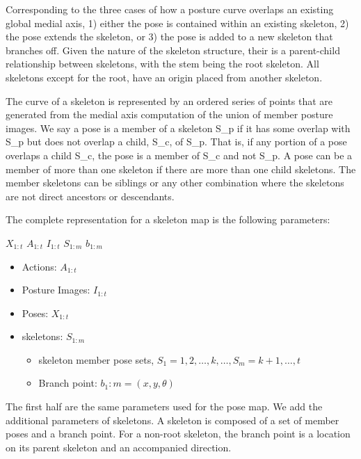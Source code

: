 Corresponding to the three cases of how a posture curve overlaps an existing global medial axis, 1) either the pose is contained within an existing skeleton, 2) the pose extends the skeleton, or 3) the pose is added to a new skeleton that branches off. Given the nature of the skeleton structure, their is a parent-child relationship between skeletons, with the stem being the root skeleton. All skeletons except for the root, have an origin placed from another skeleton.

The curve of a skeleton is represented by an ordered series of points that are generated from the medial axis computation of the union of member posture images. We say a pose is a member of a skeleton S\_p if it has some overlap with S\_p but does not overlap a child, S\_c, of S\_p. That is, if any portion of a pose overlaps a child S\_c, the pose is a member of S\_c and not S\_p. A pose can be a member of more than one skeleton if there are more than one child skeletons. The member skeletons can be siblings or any other combination where the skeletons are not direct ancestors or descendants.

The complete representation for a skeleton map is the following parameters:

$ X_{1:t} $
$ A_{1:t} $
$ I_{1:t} $
$ S_{1:m} $
$ b_{1:m} $

\begin{itemize}
\item Actions: $A_{1:t}$

\item Posture Images: $I_{1:t}$

\item Poses: $X_{1:t}$

\item skeletons: $S_{1:m}$

\begin{itemize}
\item skeleton member pose sets, $S_1 = {1,2,…,k}, …, S_m = {k+1,…,t} $

\item Branch point: $b_1:m = (x,y,\theta)$

\end{itemize}

\end{itemize}

The first half are the same parameters used for the pose map. We add the additional parameters of skeletons. A skeleton is composed of a set of member poses and a branch point. For a non-root skeleton, the branch point is a location on its parent skeleton and an accompanied direction.

